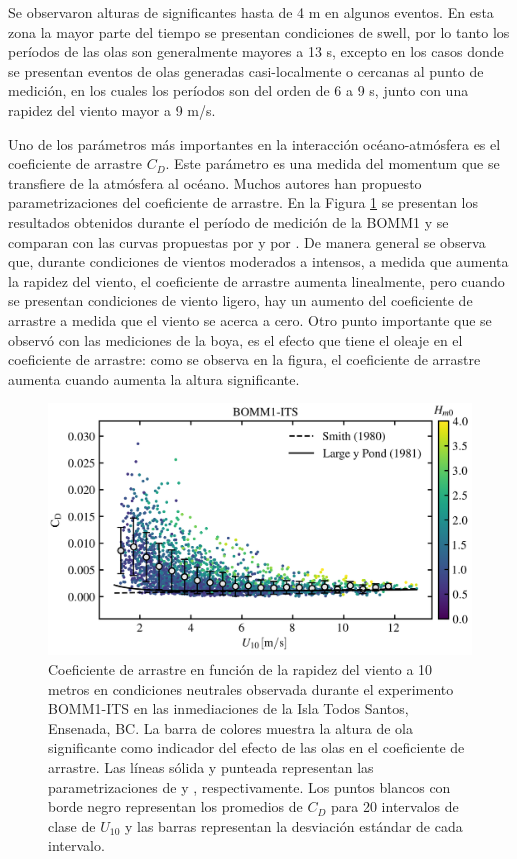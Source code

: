 \documentclass[11pt]{article}
\begin{document}
Se observaron alturas de significantes hasta de 4 m en algunos eventos. En esta
zona la mayor parte del tiempo se presentan condiciones de swell, por lo tanto
los períodos de las olas son generalmente mayores a 13 s, excepto en los casos
donde se presentan eventos de olas generadas casi-localmente o cercanas al punto
de medición, en los cuales los períodos son del orden de 6 a 9 s, junto con una
rapidez del viento mayor a 9 m/s.

Uno de los parámetros más importantes en la interacción océano-atmósfera es el
coeficiente de arrastre $C_D$. Este parámetro es una medida del momentum que se
transfiere de la atmósfera al océano. Muchos autores han propuesto
parametrizaciones del coeficiente de arrastre. En la Figura
\ref{fig:bomm1_its_drag_coefficient} se presentan los resultados obtenidos
durante el período de medición de la BOMM1 y se comparan con las curvas
propuestas por \citet{Smith1980} y por \citet{LargePond1981}. De manera general
se observa que, durante condiciones de vientos moderados a intensos, a medida
que aumenta la rapidez del viento, el coeficiente de arrastre aumenta
linealmente, pero cuando se presentan condiciones de viento ligero, hay un
aumento del coeficiente de arrastre a medida que el viento se acerca a cero.
Otro punto importante que se observó con las mediciones de la boya, es el efecto
que tiene el oleaje en el coeficiente de arrastre: como se observa en la figura,
el coeficiente de arrastre aumenta cuando aumenta la altura significante.

\begin{figure}[htpb]
  \centering
  \includegraphics[width=0.68\linewidth]{../figures/bomm1_its_drag_coefficient.png}
  \caption{
    Coeficiente de arrastre en función de la rapidez del viento a 10 metros en
    condiciones neutrales observada durante el experimento BOMM1-ITS en las
    inmediaciones de la Isla Todos Santos, Ensenada, BC.  La barra de colores
    muestra la altura de ola significante como indicador del efecto de las olas
    en el coeficiente de arrastre. Las líneas sólida y punteada representan las
    parametrizaciones de \citet{Smith1980} y \citet{LargePond1981},
    respectivamente. Los puntos blancos con borde negro representan los
    promedios de $C_D$ para 20 intervalos de clase de $U_{10}$ y las barras
    representan la desviación estándar de cada intervalo.
  }
  \label{fig:bomm1_its_drag_coefficient}
\end{figure}
\end{document}
